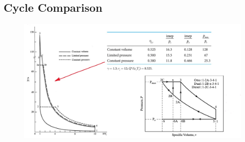 \documentclass{article}
\begin{document}
	\subsection*{Cycle Comparison}
	\begin{figure}[H]
		\begin{center}
			\includegraphics[width=\linewidth]{img/cycle_comparison.jpeg}
		\end{center}
	\end{figure}
\end{document}
